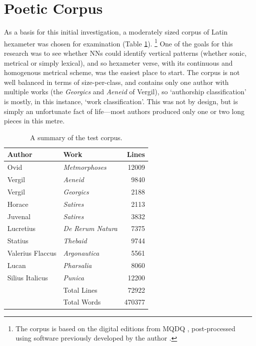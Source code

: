 \documentclass[
    twocolumn,
    hf,
]{ceurart}
\begin{document}
\section{Poetic Corpus}

As a basis for this initial investigation, a moderately sized corpus of Latin
hexameter was chosen for examination (Table \ref{tab:corpus}).%
%
\footnote{ The corpus is based on the digital editions from MQDQ
    \cite{mqdq_2007}, post-processed using software previously developed by the
    author \cite{nagy_mqdq_2019}.}
%
One of the goals for this research was to see whether NNs could identify
vertical patterns (whether sonic, metrical or simply lexical), and so hexameter
verse, with its continuous and homogenous metrical scheme, was the easiest place
to start. The corpus is not well balanced in terms of size-per-class, and
contains only one author with multiple works (the \emph{Georgics} and
\emph{Aeneid} of Vergil), so `authorship classification' is mostly, in this
instance, `work classification'. This was not by design, but is simply an
unfortunate fact of life---most authors produced only one or two long pieces in
this metre.

\begin{table}
    \caption{A summary of the test corpus.}
    \label{tab:corpus}
    \centering
    \begin{tabularx}{\linewidth}{XXr}
        Author           & Work                   & Lines  \\
        \midrule
        Ovid             & \emph{Metmorphoses}    & 12009  \\
        Vergil           & \emph{Aeneid}          & 9840   \\
        Vergil           & \emph{Georgics}        & 2188   \\
        Horace           & \emph{Satires}         & 2113   \\
        Juvenal          & \emph{Satires}         & 3832   \\
        Lucretius        & \emph{De Rerum Natura} & 7375   \\
        Statius          & \emph{Thebaid}         & 9744   \\
        Valerius Flaccus & \emph{Argonautica}     & 5561   \\
        Lucan            & \emph{Pharsalia}       & 8060   \\
        Silius Italicus  & \emph{Punica}          & 12200  \\
        \midrule
                         & Total Lines            & 72922  \\
                         & Total Words            & 470377 \\
        \midrule
    \end{tabularx}
\end{table}
\end{document}
